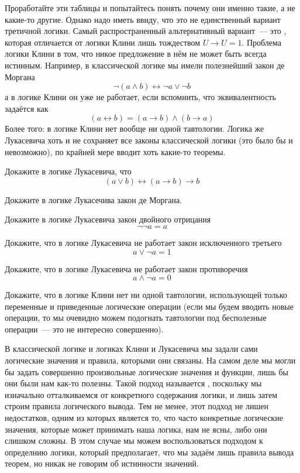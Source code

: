 Проработайте эти таблицы и попытайтесь понять почему они именно такие, а не какие-то другие. Однако надо иметь ввиду, что это не единственный вариант третичной логики. Самый распространенный альтернативный вариант~--- это , которая отличается от логики Клини лишь тождеством $U\to U = 1$. Проблема логики Клини в том, что никое предложение в нём не может быть всегда истинным. Например, в классической логике мы имели полезнейший закон де Моргана
$$\neg(a \land b) \leftrightarrow \neg a \lor \neg b$$
а в логике Клини он уже не работает, если вспомнить, что эквивалентность задаётся как
$$(a \leftrightarrow b) = (a\to b)\land (b\to a)$$
Более того: в логике Клини нет вообще ни одной тавтологии. Логика же Лукасевича хоть и не сохраняет все законы классической логики (это было бы и невозможно), по крайней мере вводит хоть какие-то теоремы.

\begin{exercise}
Докажите в логике Лукасевича, что
$$(a\lor b) \leftrightarrow (a \to b) \to b$$
\end{exercise}

\begin{exercise}
Докажите в логике Лукасечива закон де Моргана.
\end{exercise}

\begin{exercise}
Докажите в логике Лукасевича закон двойного отрицания
$$\neg\neg a = a$$
\end{exercise}

\begin{exercise}
Докажите, что в логике Лукасевича не работает закон исключенного третьего
$$a\lor \neg a = 1$$
\end{exercise}

\begin{exercise}
Докажите, что в логике Лукасевича не работает закон противоречия
$$a\land \neg a = 0$$
\end{exercise}

\begin{exercise}
Докажите, что в логике Клини нет ни одной тавтологии, использующей только переменные и приведенные логические операции (если мы будем вводить новые операции, то мы очевидно можем подогнать тавтологии под бесполезные операции~--- это не интересно совершенно).
\end{exercise}

В классической логике и логиках Клини и Лукасевича мы задали сами логические значения и правила, которыми они связаны. На самом деле мы могли бы задать совершенно произвольные логические значения и функции, лишь бы они были нам как-то полезны. Такой подход называется , поскольку мы изначально отталкиваемся от конкретного содержания логики, и лишь затем строим правила логического вывода. Тем не менее, этот подход не лишен недостатков, одним из которых является то, что часто конкретные логические значения, которые может принимать наша логика, нам не ясны, либо они слишком сложны. В этом случае мы можем воспользоваться  подходом к определнию логики, который предполагает, что мы задаём лишь правила вывода теорем, но никак не говорим об истинности значений.

